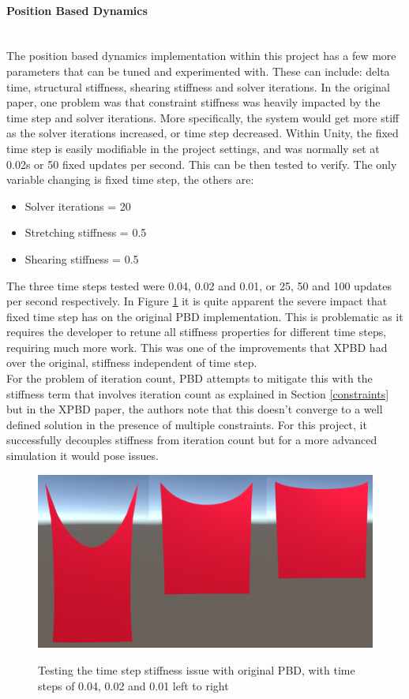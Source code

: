 \documentclass[12pt,a4paper]{article}
\begin{document}
\paragraph{Position Based Dynamics} \mbox{} \\
The position based dynamics implementation within this project has a few more parameters that can be tuned and experimented with. These can include: delta time, structural stiffness, shearing stiffness and solver iterations. In the original paper, one problem was that constraint stiffness was heavily impacted by the time step and solver iterations. More specifically, the system would get more stiff as the solver iterations increased, or time step decreased. Within Unity, the fixed time step is easily modifiable in the project settings, and was normally set at 0.02s or 50 fixed updates per second. This can be then tested to verify. The only variable changing is fixed time step, the others are: 
\begin{itemize}
	\item Solver iterations = 20
	\item Stretching stiffness = 0.5
	\item Shearing stiffness = 0.5
\end{itemize}

The three time steps tested were 0.04, 0.02 and 0.01, or 25, 50 and 100 updates per second respectively. In Figure \ref{fig:pbdts} it is quite apparent the severe impact that fixed time step has on the original PBD implementation. This is problematic as it requires the developer to retune all stiffness properties for different time steps, requiring much more work. This was one of the improvements that XPBD had over the original, stiffness independent of time step. \\

For the problem of iteration count, PBD attempts to mitigate this with the stiffness term that involves iteration count as explained in Section \ref{constraints} but in the XPBD paper, the authors note that this doesn't converge to a well defined solution in the presence of multiple constraints. For this project, it successfully decouples stiffness from iteration count but for a more advanced simulation it would pose issues. \\
\begin{figure}
	\centering
	\caption{Testing the time step stiffness issue with original PBD, with time steps of 0.04, 0.02 and 0.01 left to right}
	\includegraphics[scale=0.5]{pbdtscomp.png}
	\label{fig:pbdts}
\end{figure}
\end{document}
